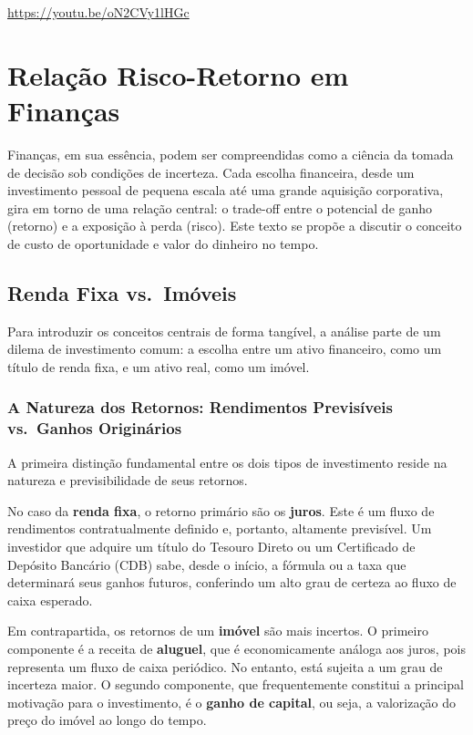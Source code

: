 \documentclass[
  a4paper,
]{book}
\begin{document}
\url{https://youtu.be/oN2CVy1lHGc}

\section{Relação Risco-Retorno em
Finanças}\label{relauxe7uxe3o-risco-retorno-em-finanuxe7as}

Finanças, em sua essência, podem ser compreendidas como a ciência da
tomada de decisão sob condições de incerteza. Cada escolha financeira,
desde um investimento pessoal de pequena escala até uma grande aquisição
corporativa, gira em torno de uma relação central: o trade-off entre o
potencial de ganho (retorno) e a exposição à perda (risco). Este texto
se propõe a discutir o conceito de custo de oportunidade e valor do
dinheiro no tempo.

\subsection{Renda Fixa vs.~Imóveis}\label{renda-fixa-vs.-imuxf3veis}

Para introduzir os conceitos centrais de forma tangível, a análise parte
de um dilema de investimento comum: a escolha entre um ativo financeiro,
como um título de renda fixa, e um ativo real, como um imóvel.

\subsubsection{A Natureza dos Retornos: Rendimentos Previsíveis
vs.~Ganhos
Originários}\label{a-natureza-dos-retornos-rendimentos-previsuxedveis-vs.-ganhos-originuxe1rios}

A primeira distinção fundamental entre os dois tipos de investimento
reside na natureza e previsibilidade de seus retornos.

No caso da \textbf{renda fixa}, o retorno primário são os
\textbf{juros}. Este é um fluxo de rendimentos contratualmente definido
e, portanto, altamente previsível. Um investidor que adquire um título
do Tesouro Direto ou um Certificado de Depósito Bancário (CDB) sabe,
desde o início, a fórmula ou a taxa que determinará seus ganhos futuros,
conferindo um alto grau de certeza ao fluxo de caixa esperado.

Em contrapartida, os retornos de um \textbf{imóvel} são mais incertos. O
primeiro componente é a receita de \textbf{aluguel}, que é
economicamente análoga aos juros, pois representa um fluxo de caixa
periódico. No entanto, está sujeita a um grau de incerteza maior. O
segundo componente, que frequentemente constitui a principal motivação
para o investimento, é o \textbf{ganho de capital}, ou seja, a
valorização do preço do imóvel ao longo do tempo.
\end{document}
